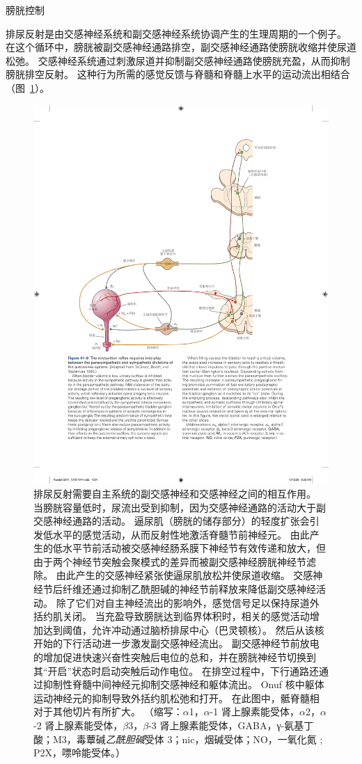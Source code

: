 膀胱控制

排尿反射是由交感神经系统和副交感神经系统协调产生的生理周期的一个例子。
在这个循环中，膀胱被副交感神经通路排空，副交感神经通路使膀胱收缩并使尿道松弛。
交感神经系统通过刺激尿道并抑制副交感神经通路使膀胱充盈，从而抑制膀胱排空反射。
这种行为所需的感觉反馈与脊髓和脊髓上水平的运动流出相结合（图~\ref{fig:41_8}）。


\begin{figure}[htbp]
	\centering
	\includegraphics[width=0.9\linewidth]{chap41/fig_41_8}
	\caption{排尿反射需要自主系统的副交感神经和交感神经之间的相互作用\cite{de1993neurophysiology}。
		当膀胱容量低时，尿流出受到抑制，因为交感神经通路的活动大于副交感神经通路的活动。
		逼尿肌（膀胱的储存部分）的轻度扩张会引发低水平的感觉活动，从而反射性地激活脊髓节前神经元。
		由此产生的低水平节前活动被交感神经肠系膜下神经节有效传递和放大，但由于两个神经节突触会聚模式的差异而被副交感神经膀胱神经节滤除。
		由此产生的交感神经紧张使逼尿肌放松并使尿道收缩。
		交感神经节后纤维还通过抑制乙酰胆碱的神经节前释放来降低副交感神经活动。
		除了它们对自主神经流出的影响外，感觉信号足以保持尿道外括约肌关闭。
		当充盈导致膀胱达到临界体积时，相关的感觉活动增加达到阈值，允许冲动通过脑桥排尿中心（巴灵顿核）。
		然后从该核开始的下行活动进一步激发副交感神经流出。
		副交感神经节前放电的增加促进快速兴奋性突触后电位的总和，并在膀胱神经节切换到其“开启”状态时启动突触后动作电位。
		在排空过程中，下行通路还通过抑制性脊髓中间神经元抑制交感神经和躯体流出。
		Onuf 核中躯体运动神经元的抑制导致外括约肌松弛和打开。
		在此图中，骶脊髓相对于其他切片有所扩大。 （缩写：$\alpha$1，$\alpha$-1 肾上腺素能受体，$\alpha$2，$\alpha$-2 肾上腺素能受体，$\beta$3，$\beta$-3 肾上腺素能受体，GABA，γ-氨基丁酸；M3，毒蕈碱\textit{乙酰胆碱}受体 3；nic，烟碱受体；NO，一氧化氮 ; P2X，嘌呤能受体。）}
	\label{fig:41_8}
\end{figure}


